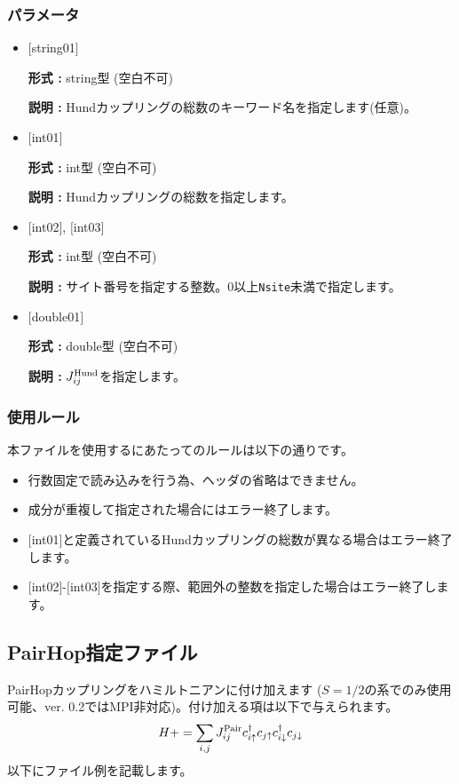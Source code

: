 \subsubsection{パラメータ}
 \begin{itemize}

   \item  $[$string01$]$
   
    {\bf 形式 :} string型 (空白不可)

   {\bf 説明 :} Hundカップリングの総数のキーワード名を指定します(任意)。

   \item  $[$int01$]$
   
    {\bf 形式 :} int型 (空白不可)

   {\bf 説明 :} Hundカップリングの総数を指定します。

  \item  $[$int02$]$, $[$int03$]$
  
 {\bf 形式 :} int型 (空白不可)

{\bf 説明 :} サイト番号を指定する整数。0以上\verb|Nsite|{未満}で指定します。
 
 \item  $[$double01$]$
   
   {\bf 形式 :} double型 (空白不可)

  {\bf 説明 :}  $J_{ij}^{\rm Hund}$を指定します。
  
\end{itemize}

\subsubsection{使用ルール}
本ファイルを使用するにあたってのルールは以下の通りです。
\begin{itemize}
\item 行数固定で読み込みを行う為、ヘッダの省略はできません。
\item 成分が重複して指定された場合にはエラー終了します。
\item $[$int01$]$と定義されているHundカップリングの総数が異なる場合はエラー終了します。
\item $[$int02$]$-$[$int03$]$を指定する際、範囲外の整数を指定した場合はエラー終了します。
\end{itemize}

\newpage
\subsection{PairHop指定ファイル}
PairHopカップリングをハミルトニアンに付け加えます{ ($S=1/2$の系でのみ使用可能、ver. 0.2ではMPI非対応)}。付け加える項は以下で与えられます。
\begin{equation}
H+=\sum_{i,j}J_{ij}^{\rm Pair} c_ {i \uparrow}^{\dag}c_{j\uparrow}c_{i \downarrow}^{\dag}c_{j  \downarrow}
\end{equation}
以下にファイル例を記載します。

